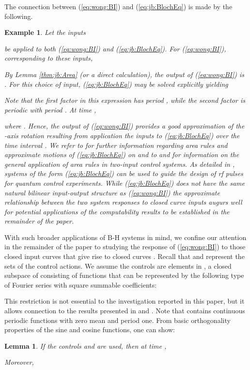 \documentclass[12pt,onecolumn,draftcls]{IEEEtran}
\newtheorem{lemma}{Lemma}[section]
\newtheorem{example}{Example}[section]
\begin{document}
The connection between (\ref{eq:wong:BI}) and (\ref{eq:jb:BlochEq}) is made by the following.
\medskip
\begin{example}\rm
Let the inputs

be applied to both (\ref{eq:wong:BI}) and (\ref{eq:jb:BlochEq}).  For (\ref{eq:wong:BI}), corresponding to these inputs,

By Lemma \ref{thm:jb:Area} (or a direct calculation), the output of (\ref{eq:wong:BI}) is .  For this choice of input, (\ref{eq:jb:BlochEq}) may be solved explicitly yielding

Note that the first factor in this expression has period , while the second factor is periodic with period .  At time ,

where .  Hence, the output of (\ref{eq:wong:BI}) provides a good approximation of the -axis rotation  resulting from application the inputs  to (\ref{eq:jb:BlochEq}) over the time interval .
We refer to \cite{WB} for further information regarding area rules and approximate motions of (\ref{eq:jb:BlochEq}) on  and to \cite{LeonardKrishna} and  \cite{brockett2}
 for information on the general application of area rules in two-input control systems.  As detailed in \cite{JrShinLi}, systems of the form (\ref{eq:jb:BlochEq}) can be used to guide the design of rf pulses for quantum control experiments.  
While (\ref{eq:jb:BlochEq}) does not have the same natural bilinear input-output structure as (\ref{eq:wong:BI}) the approximate relationship between the two system responses to closed curve inputs augurs well for potential applications of the computability results to be established in the remainder of the paper.
\end{example}

With such broader applications of B-H systems in mind, we confine our attention in the remainder of the paper to studying the response of (\ref{eq:wong:BI}) to those closed input curves  that give rise to closed curves .  Recall that  and 
represent the sets of the control actions.  We assume the controls are elements in , a closed subspace of  consisting of functions that can be represented by the following type
of Fourier series with square summable coefficients: 

This restriction is not essential to the investigation reported in this paper, but it
allows connection to the results presented in \cite{WB} and \cite{CDC09}.
Note that  contains continuous periodic functions with zero mean and period one.
From basic orthogonality properties of the sine and cosine functions, one can show:
\begin{lemma}
\label{lemma:1}
If the controls  and  are used, then at time ,

Moreover,


\end{lemma}
\end{document}
